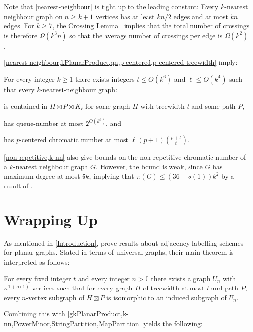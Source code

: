 \documentclass{patmorin}
\renewcommand{\ge}{\geqslant}
\renewcommand{\geq}{\geqslant}
\renewcommand{\leq}{\leqslant}
\begin{document}
Note that \cref{nearest-neighbour} is tight up to the leading constant:  Every $k$-nearest neighbour graph on $n\ge k+1$ vertices has at least $kn/2$ edges and at most $kn$ edges.  For $k\ge 7$, the Crossing Lemma~\citep{ajtai.chvatal.ea:crossing-free,leighton:complexity} implies that the total number of crossings is therefore $\Omega(k^3n)$ so that the average number of crossings per edge is $\Omega(k^2)$.

\cref{nearest-neighbour,kPlanarProduct,qn,p-centered,p-centered-treewidth} imply:

\begin{cor}
\label{k-nn}
For every integer $k\geq 1$ there exists integers $t\leq O(k^6)$ and $\ell\leq O(k^4)$ such that every $k$-nearest-neighbour graph:
\begin{compactitem}
\item is contained in $H\boxtimes P \boxtimes K_\ell$ for some graph $H$ with treewidth $t$ and some path $P$,
\item has queue-number at most $2^{O(k^6)}$, and
\item has $p$-centered chromatic number at most $\ell (p+1)\binom{p+t}{t}$.
\end{compactitem}
\end{cor}

\cref{non-repetitive,k-nn} also give bounds on the non-repetitive chromatic number of a $k$-nearest neighbour graph $G$. However, the bound is weak, since $G$ has maximum degree at most $6k$, implying that $\pi(G) \leq (36+o(1))k^2$ by a result of \citet{DJKW16}.

\section{Wrapping Up}
\label{WrappingUp}

As mentioned in \cref{Introduction}, \citet{DEJGMM21} prove results about adjacency labelling schemes for planar graphs. Stated in terms of universal graphs, their main theorem is interpreted as follows:

\begin{thm}
	\label{Universal}
	For every fixed integer $t$ and every integer $n>0$ there exists a
	graph $U_n$ with $n^{1+o(1)}$ vertices such that for every graph $H$ of
	treewidth at most $t$ and path $P$, every $n$-vertex subgraph of $H\boxtimes P$ is isomorphic to an induced subgraph of $U_n$.
\end{thm}

Combining this with \cref{gkPlanarProduct,k-nn,PowerMinor,StringPartition,MapPartition} yields the following:
\end{document}
